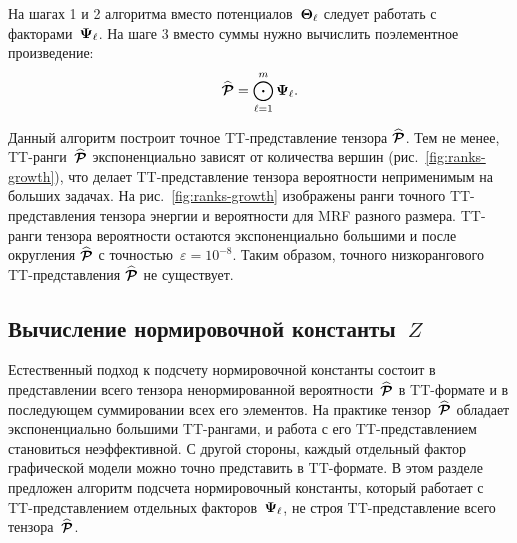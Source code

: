 На шагах 1 и 2 алгоритма вместо потенциалов~$\boldsymbol{\Theta}_\ell$ следует работать с факторами~$\boldsymbol{\Psi}_{\ell}$. На шаге 3 вместо суммы нужно вычислить поэлементное произведение:
\begin{equation}
\widehat{\boldsymbol{\mathcal{P}}} =   \bigodot_{\ell = 1}^{m} \boldsymbol{\Psi}_{\ell}.
\end{equation}

Данный алгоритм построит точное TT\hyp{}представление тензора $\widehat{\boldsymbol{\mathcal{P}}}$. Тем не менее, TT\hyp{}ранги~$\widehat{\boldsymbol{\mathcal{P}}}$ экспоненциально зависят от количества вершин (рис.~\ref{fig:ranks-growth}), что делает TT\hyp{}представление тензора вероятности неприменимым на больших задачах. На рис.~\ref{fig:ranks-growth} изображены ранги точного TT-представления тензора энергии и вероятности для MRF разного размера. TT\hyp{}ранги тензора вероятности остаются экспоненциально большими и после округления $\widehat{\boldsymbol{\mathcal{P}}}$ с точностью~$\varepsilon = 10^{-8}$. Таким образом, точного низкорангового TT\hyp{}представления $\widehat{\boldsymbol{\mathcal{P}}}$ не существует.



\subsection{Вычисление нормировочной константы~$Z$}
\label{sec:partition-function}
Естественный подход к подсчету нормировочной константы состоит в представлении всего тензора ненормированной вероятности~$\widehat{\boldsymbol{\mathcal{P}}}$ в TT\hyp{}формате и в последующем суммировании всех его элементов. На практике тензор~$\widehat{\boldsymbol{\mathcal{P}}}$ обладает экспоненциально большими TT\hyp{}рангами, и работа с его TT\hyp{}представлением становиться неэффективной. С другой стороны, каждый отдельный фактор графической модели можно точно представить в TT\hyp{}формате. В этом разделе предложен алгоритм подсчета нормировочный константы, который работает с TT\hyp{}представлением отдельных факторов~$\boldsymbol{\Psi}_{\ell}$, не строя TT\hyp{}представление всего тензора~$\widehat{\boldsymbol{\mathcal{P}}}$.

